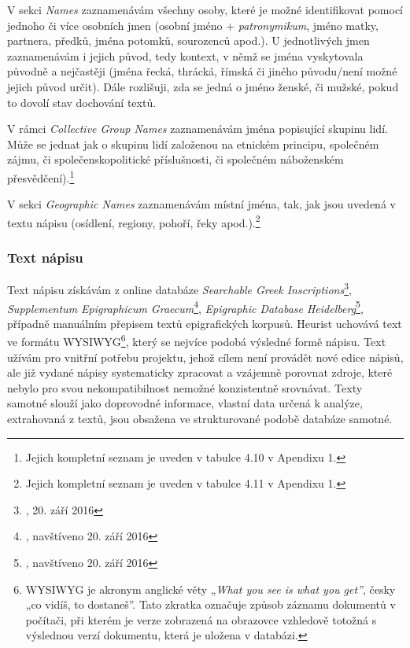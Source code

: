 \startitemize
\item
  \startblockquote
  V sekci {\em Names} zaznamenávám všechny osoby, které je možné identifikovat pomocí jednoho či více osobních jmen (osobní jméno + {\em patronymikum}, jméno matky, partnera, předků, jména potomků, sourozenců apod.). U jednotlivých jmen zaznamenávám i jejich původ, tedy kontext, v němž se jména vyskytovala původně a nejčastěji (jména řecká, thrácká, římská či jiného původu/není možné jejich původ určit). Dále rozlišuji, zda se jedná o jméno ženské, či mužské, pokud to dovolí stav dochování textů.
  \stopblockquote
\item
  \startblockquote
  V rámci {\em Collective Group Names} zaznamenávám jména popisující skupinu lidí. Může se jednat jak o skupinu lidí založenou na etnickém principu, společném zájmu, či společenskopolitické příslušnosti, či společném náboženském přesvědčení).\footnote{Jejich kompletní seznam je uveden v tabulce 4.10 v Apendixu 1.}
  \stopblockquote
\item
  \startblockquote
  V sekci {\em Geographic Names} zaznamenávám místní jména, tak, jak jsou uvedená v textu nápisu (osídlení, regiony, pohoří, řeky apod.).\footnote{Jejich kompletní seznam je uveden v tabulce 4.11 v Apendixu 1.}
  \stopblockquote
\stopitemize

\subsubsection[text-nápisu]{Text nápisu}

Text nápisu získávám z online databáze {\em Searchable Greek Inscriptions}\footnote{\from[url5], 20. září 2016}, {\em Supplementum Epigraphicum Graecum}\footnote{\from[url6], navštíveno 20. září 2016}, {\em Epigraphic Database Heidelberg}\footnote{\from[url7], navštíveno 20. září 2016}, případně manuálním přepisem textů epigrafických korpusů. Heurist uchovává text ve formátu WYSIWYG\footnote{WYSIWYG je akronym anglické věty „{\em What you see is what you get”}, česky „co vidíš, to dostaneš”. Tato zkratka označuje způsob záznamu dokumentů v počítači, při kterém je verze zobrazená na obrazovce vzhledově totožná s výslednou verzí dokumentu, která je uložena v databázi.}, který se nejvíce podobá výsledné formě nápisu. Text užívám pro vnitřní potřebu projektu, jehož cílem není provádět nové edice nápisů, ale již vydané nápisy systematicky zpracovat a vzájemně porovnat zdroje, které nebylo pro svou nekompatibilnost nemožné konzistentně srovnávat. Texty samotné slouží jako doprovodné informace, vlastní data určená k analýze, extrahovaná z textů, jsou obsažena ve strukturované podobě databáze samotné.

